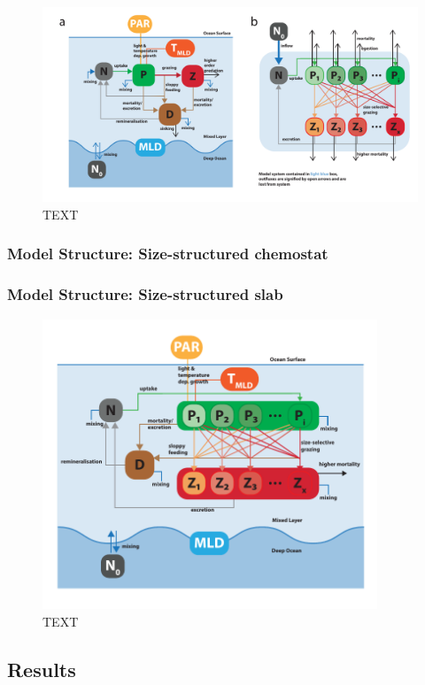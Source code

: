 \documentclass[journal abbreviation, manuscript]{copernicus}
\begin{document}
\begin{figure}[t]
\includegraphics[width=15cm]{Figures/firstdraft_schematics/02__schematics_NPZDandChemostat.pdf}
\caption{TEXT}
\label{phydraschematics_1}
\end{figure}

\subsubsection{Model Structure: Size-structured chemostat}

\subsubsection{Model Structure: Size-structured slab}
\begin{figure}[t]
\includegraphics[width=10cm]{Figures/firstdraft_schematics/03__schematics_SizeStructSlab.pdf}
\caption{TEXT}
\label{phydraschematics_3}
\end{figure}


\subsection{Results}
\end{document}
